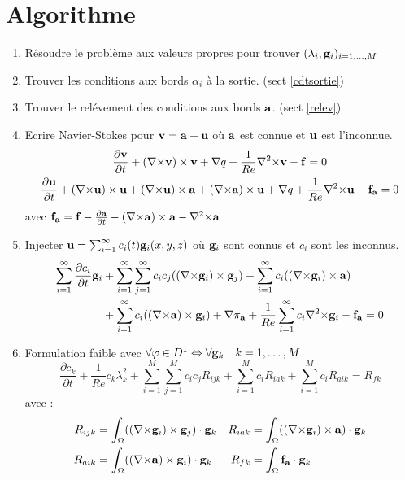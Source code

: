 \documentclass[a4paper,11pt]{article}
\begin{document}
\section{Algorithme}
\label{algo}
\begin{enumerate}
\item
  Résoudre le problème aux valeurs propres pour trouver $(\lambda_i,{\mathbf{g}}_i)_{i=1,\dots,M}$
\item
  Trouver les conditions aux bords $\alpha_i$ à la sortie. (sect \ref{cdtsortie})
\item
  Trouver le relévement des conditions aux bords ${\mathbf{a}}$. (sect \ref{relev})
\item
  Ecrire Navier-Stokes pour ${\mathbf{v}}={\mathbf{a}}+{\mathbf{u}}$ où ${\mathbf{a}}$ est connue et ${\mathbf{u}}$ est l'inconnue.
  \begin{gather*}
    \frac{\partial {\mathbf{v}}}{\partial t} + ({\nabla\times}  {\mathbf{v}})\times {\mathbf{v}} + {\nabla} q + \frac{1}{Re}{\nabla^2\times}  {\mathbf{v}}-{\mathbf{f}} = 0\\
    \frac{\partial {\mathbf{u}}}{\partial t} + ({\nabla\times} {\mathbf{u}})\times {\mathbf{u}} + ({\nabla\times} {\mathbf{u}})\times {\mathbf{a}} +({\nabla\times} {\mathbf{a}})\times {\mathbf{u}} + {\nabla} q +\frac{1}{Re}{\nabla^2\times}  {\mathbf{u}} - {\mathbf{f_a}} = 0\\
  \end{gather*}
  avec ${\mathbf{f_a}}={\mathbf{f}}-\frac{\partial {\mathbf{a}}}{\partial t} - ({\nabla\times} {\mathbf{a}})\times {\mathbf{a}} - {\nabla^2\times}{\mathbf{a}}$
\item
  Injecter ${\mathbf{u}}=\sum_{i=1}^\infty c_i(t){\mathbf{g}}_i(x,y,z)$ où ${\mathbf{g}}_i$ sont connus et $c_i$ sont les inconnus.
  \begin{align*}
    \sum_{i=1}^\infty\frac{\partial c_i}{\partial t}{\mathbf{g}}_i &+ \sum_{i=1}^\infty\sum_{j=1}^\infty c_i c_j(({\nabla\times}{\mathbf{g}}_i)\times {\mathbf{g}}_j) + \sum_{i=1}^\infty c_i(({\nabla\times}{\mathbf{g}}_i)\times {\mathbf{a}})\\
    & + \sum_{i=1}^\infty c_i(({\nabla\times}{\mathbf{a}})\times {\mathbf{g}}_i) + {\nabla} \pi_{{\mathbf{a}}} +\frac{1}{Re}\sum_{i=1}^\infty c_i{\nabla^2\times}{\mathbf{g}}_i - {\mathbf{f_a}} = 0
  \end{align*}
\item
  Formulation faible avec $\forall \varphi\in D^1 \Leftrightarrow \forall {\mathbf{g}}_k\quad k=1,\dots,M$
  \begin{equation*}
    \frac{\partial c_k}{\partial t} + \frac{1}{Re}c_k\lambda_k^2 + \sum_{i=1}^M\sum_{j=1}^Mc_ic_jR_{ijk} + \sum_{i=1}^Mc_iR_{iak} + \sum_{i=1}^Mc_iR_{aik} = R_{fk}
  \end{equation*}
  avec :
  \begin{align*}
    R_{ijk} &= \int_\Omega(({\nabla\times}\mathbf{g}_i)\times \mathbf{g}_j)\cdot\mathbf{g}_k & R_{iak} &= \int_\Omega(({\nabla\times}\mathbf{g}_i)\times \mathbf{a})\cdot\mathbf{g}_k\\
    R_{aik} &= \int_\Omega(({\nabla\times}\mathbf{a})\times \mathbf{g}_i)\cdot\mathbf{g}_k & R_{fk} &= \int_\Omega\mathbf{f_a}\cdot\mathbf{g}_k
  \end{align*}
\end{enumerate}
\end{document}
